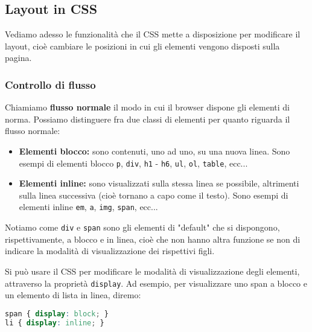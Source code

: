\documentclass[a4paper,11pt]{article}
\begin{document}
\subsection{Layout in CSS}
Vediamo adesso le funzionalità che il CSS mette a disposizione per modificare il layout, cioè cambiare le posizioni in cui gli elementi vengono disposti sulla pagina.

\subsubsection{Controllo di flusso}
Chiamiamo \textbf{flusso normale} il modo in cui il browser dispone gli elementi di norma.
Possiamo distinguere fra due classi di elementi per quanto riguarda il flusso normale:
\begin{itemize}
	\item \textbf{Elementi blocco:} sono contenuti, uno ad uno, su una nuova linea.
		Sono esempi di elementi blocco \lstinline|p|, \lstinline|div|, \lstinline|h1| - \lstinline|h6|, \lstinline|ul|, \lstinline|ol|, \lstinline|table|, ecc...
	\item \textbf{Elementi inline:} sono visualizzati sulla stessa linea se possibile, altrimenti sulla linea successiva (cioè tornano a capo come il testo). 
		Sono esempi di elementi inline \lstinline|em|, \lstinline|a|, \lstinline|img|, \lstinline|span|, ecc...
\end{itemize}
Notiamo come \lstinline|div| e \lstinline|span| sono gli elementi di "default" che si dispongono, rispettivamente, a blocco e in linea, cioè che non hanno altra funzione se non di indicare la modalità di visualizzazione dei rispettivi figli.

Si può usare il CSS per modificare le modalità di visualizzazione degli elementi, attraverso la proprietà \lstinline|display|. 
Ad esempio, per visualizzare uno span a blocco e un elemento di lista in linea, diremo:
\begin{lstlisting}[language=css, style=codestyle]	
span { display: block; }
li { display: inline; }
\end{lstlisting}
\end{document}
